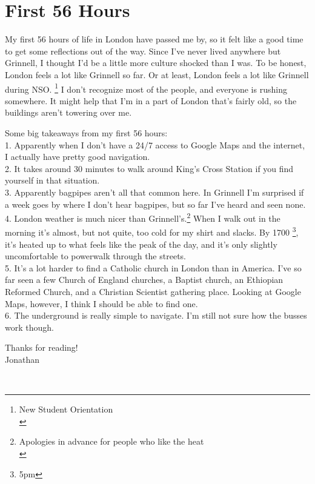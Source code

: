 \hypertarget{first-56-hours.html}{%
\section{First 56 Hours}\label{first-56-hours}}

My first 56 hours of life in London have passed me by, so it felt like a
good time to get some reflections out of the way. Since I've never lived
anywhere but Grinnell, I thought I'd be a little more culture shocked
than I was. To be honest, London feels a lot like Grinnell so far. Or at
least, London feels a lot like Grinnell during NSO. \footnote{New
  Student Orientation\\} I don't recognize most of the people, and
everyone is rushing somewhere. It might help that I'm in a part of
London that's fairly old, so the buildings aren't towering over me.

Some big takeaways from my first 56 hours:\\
1. Apparently when I don't have a 24/7 access to Google Maps and the
internet, I actually have pretty good navigation.\\
2. It takes around 30 minutes to walk around King's Cross Station if you
find yourself in that situation.\\
3. Apparently bagpipes aren't all that common here. In Grinnell I'm
surprised if a week goes by where I don't hear bagpipes, but so far I've
heard and seen none.\\
4. London weather is much nicer than Grinnell's.\footnote{Apologies in
  advance for people who like the heat\\} When I walk out in the morning
it's almost, but not quite, too cold for my shirt and slacks. By 1700
\footnote{5pm}, it's heated up to what feels like the peak of the day,
and it's only slightly uncomfortable to powerwalk through the streets.\\
5. It's a lot harder to find a Catholic church in London than in
America. I've so far seen a few Church of England churches, a Baptist
church, an Ethiopian Reformed Church, and a Christian Scientist
gathering place. Looking at Google Maps, however, I think I should be
able to find one.\\
6. The underground is really simple to navigate. I'm still not sure how
the busses work though.

Thanks for reading!\\
Jonathan

~
